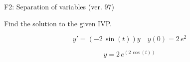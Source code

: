 \begin{exercise}
  \begin{exerciseTitle}F2: Separation of variables (ver. 97)\end{exerciseTitle}
  \begin{exerciseStatement}
    
Find the solution to the given IVP.

    
\[y'=( -2 \, \sin\left(t\right) )y\hspace{1em} y(0)= 2 \, e^{2}\]

  \end{exerciseStatement}
  \begin{exerciseAnswer}
    
\[y= 2 \, e^{\left(2 \, \cos\left(t\right)\right)}\]

  \end{exerciseAnswer}
\end{exercise}